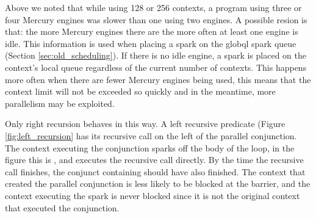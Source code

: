 Above we noted that while using 128 or 256 contexts,
a program using three or four Mercury engines was slower than one using
two engines.
A possible resion is that:
the more Mercury engines there are the more often at least one engine is
idle.
This information is used when placing a spark on the globql spark
queue (Section \ref{sec:old_scheduling}).
If there is no idle engine,
a spark is placed on the context's local queue regardless of the current
number of contexts.
This happens more often when there are fewer Mercury engines being used,
this means that the context limit will not be exceeded so quickly
and in the meantime,
more parallelism may be exploited.

Only right recursion behaves in this way.
A left recursive predicate (Figure \ref{fig:left_recursion} has its
recursive call on the left of the parallel conjunction.
The context executing the conjunction sparks off the body of the loop,
in the figure this is ,
and executes the recursive call directly.
By the time the recursive call finishes,
the conjunct containing  should have also finished.
The context that created the parallel conjunction is less likely to be
blocked at the barrier,
and the context executing the spark is never blocked since it is not the
original context that executed the conjunction.

